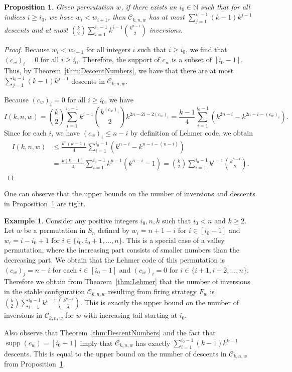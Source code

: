 \documentclass[final]{dmtcs-episciences}
\newtheorem{proposition}[theorem]{Proposition}
\theoremstyle{definition}
\newtheorem{example}{Example}
\theoremstyle{remark}
\DeclareMathOperator{\supp}{supp}
\begin{document}
\begin{proposition}\label{prop:IncreasingTail}
    Given permutation $w$, if there exists an $i_0\in \mathbb{N}$ such that for all indices $i\geq i_0$, we have $w_i < w_{i+1}$, then $\mathcal{C}_{k, n, w}$ has at most $\sum_{j=1}^{i_0-1}(k-1)k^{j-1}$ descents and at most $\binom{k}{2} \sum_{i=1}^{i_0-1}k^{i-1}\binom{k^{n-i}}{2}$ inversions.
\end{proposition}
\begin{proof}
    Because $w_i < w_{i+1}$ for all integers $i$ such that $i \geq i_0$, we find that $(c_{w})_i = 0$ for all $i \geq i_0$. Therefore, the support of $c_w$ is a subset of $[i_0-1]$. Thus, by Theorem~\ref{thm:DescentNumbers}, we have that there are at most $\sum_{j=1}^{i_0-1}(k-1)k^{j-1}$ descents in $\mathcal{C}_{k, n, w}$.

    Because $(c_{w})_i = 0$ for all $i \geq i_0$, we have
    $$I(k, n, w) = \binom{k}{2} \sum_{i=1}^{i_0-1}k^{i-1}\binom{k^{(c_w)_{i}} }{2}k^{2n-2i-2(c_w)_i} = \frac{k-1}{4}\sum_{i=1}^{i_0-1}(k^{2n-i} - k^{2n-i-(c_w)_i}).$$
    Since for each $i$, we have $(c_w)_i \leq n-i$ by definition of Lehmer code, we obtain
    \begin{equation*}
        \begin{split}
            I(k, n, w) & \leq   \frac{k^n(k-1)}{4} \sum_{i=1}^{i_0-1}(k^{n-i}-k^{n-i-(n-i)}) \\ & = \frac{k(k-1)}{4} \sum_{i=1}^{i_0-1}k^{n-1}(k^{n-i}-1) = \binom{k}{2} \sum_{i=1}^{i_0-1}k^{i-1}\binom{k^{n-i}}{2}.
        \end{split}\end{equation*}\end{proof}

One can observe that the upper bounds on the number of inversions and descents in Proposition~\ref{prop:IncreasingTail} are tight.
\begin{example}
Consider any positive integers $i_0, n, k$ such that $i_0 < n$ and $k \geq 2$. Let $w$ be a permutation in $S_n$ defined by $w_i = n+1-i$ for $i \in [i_0-1]$ and $w_i = i-i_0+1$ for $i \in \{i_0, i_0+1, \dots, n \}$. This is a special case of a valley permutation, where the increasing part consists of smaller numbers than the decreasing part. We obtain that the Lehmer code of this permutation is $(c_w)_j = n-i$ for each $i \in [i_0-1]$ and $(c_w)_i = 0$ for $i \in \{i+1, i+2, \dots, n\}$. Therefore we obtain from Theorem~\ref{thm:Lehmer} that the number of inversions in the stable configuration $\mathcal{C}_{k,n, w}$ resulting from firing strategy $F_w$ is $\binom{k}{2}\sum_{i=1}^{i_0-1} k^{i-1}\binom{k^{n-i}}{2}$. This is exactly the upper bound on the number of inversions in $\mathcal{C}_{k, n, w}$ for $w$ with increasing tail starting at $i_0$.

Also observe that Theorem~\ref{thm:DescentNumbers} and the fact that $\supp(c_w) = [i_0-1]$ imply that $\mathcal{C}_{k,n,w}$ has exactly $\sum_{i=1}^{i_0-1}(k-1)k^{k-1}$ descents. This is equal to the upper bound on the number of descents in $\mathcal{C}_{k,n,w}$ from Proposition~\ref{prop:IncreasingTail}. 
\end{example}
\end{document}
